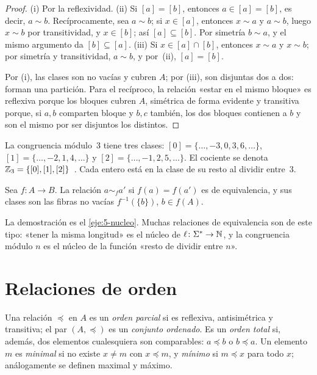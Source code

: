 \begin{proof}
(i) Por la reflexividad. (ii) Si $[a]=[b]$, entonces $a\in[a]=[b]$, es decir, $a\sim b$. Recíprocamente, sea $a\sim b$; si $x\in[a]$, entonces $x\sim a$ y $a\sim b$, luego $x\sim b$ por transitividad, y $x\in[b]$; así $[a]\subseteq[b]$. Por simetría $b\sim a$, y el mismo argumento da $[b]\subseteq[a]$. (iii) Si $x\in[a]\cap[b]$, entonces $x\sim a$ y $x\sim b$; por simetría y transitividad, $a\sim b$, y por~(ii), $[a]=[b]$.

Por (i), las clases son no vacías y cubren $A$; por (iii), son disjuntas dos a dos: forman una partición. Para el recíproco, la relación «estar en el mismo bloque» es reflexiva porque los bloques cubren $A$, simétrica de forma evidente y transitiva porque, si $a,b$ comparten bloque y $b,c$ también, los dos bloques contienen a $b$ y son el mismo por ser disjuntos los distintos.
\end{proof}

\begin{ejemplo}\label{ej:t5-modn}
La congruencia módulo~3 tiene tres clases: $[0]=\{\dots,-3,0,3,6,\dots\}$, $[1]=\{\dots,-2,1,4,\dots\}$ y $[2]=\{\dots,-1,2,5,\dots\}$. El cociente se denota $\mathbb{Z}_3=\{[0],[1],[2]\}$~\cite[§11.5]{hammack}. Cada entero está en la clase de su resto al dividir entre~3.
\end{ejemplo}

\begin{proposicion}\label{prop:t5-nucleo}
Sea $f\colon A\to B$. La relación $a\sim_f a'$ si $f(a)=f(a')$ es de equivalencia, y sus clases son las fibras no vacías $f^{-1}(\{b\})$, $b\in f(A)$.
\end{proposicion}

La demostración es el \cref{eje:5-nucleo}. Muchas relaciones de equivalencia son de este tipo: «tener la misma longitud» es el núcleo de $\ell\colon\Sigma^{*}\to\mathbb{N}$, y la congruencia módulo $n$ es el núcleo de la función «resto de dividir entre $n$».

\section{Relaciones de orden}

\begin{definicion}[Orden]
Una relación $\preceq$ en $A$ es un \emph{orden parcial} si es reflexiva, antisimétrica y transitiva; el par $(A,\preceq)$ es un \emph{conjunto ordenado}. Es un \emph{orden total} si, además, dos elementos cualesquiera son comparables: $a\preceq b$ o $b\preceq a$. Un elemento $m$ es \emph{minimal} si no existe $x\neq m$ con $x\preceq m$, y \emph{mínimo} si $m\preceq x$ para todo $x$; análogamente se definen maximal y máximo.
\end{definicion}

